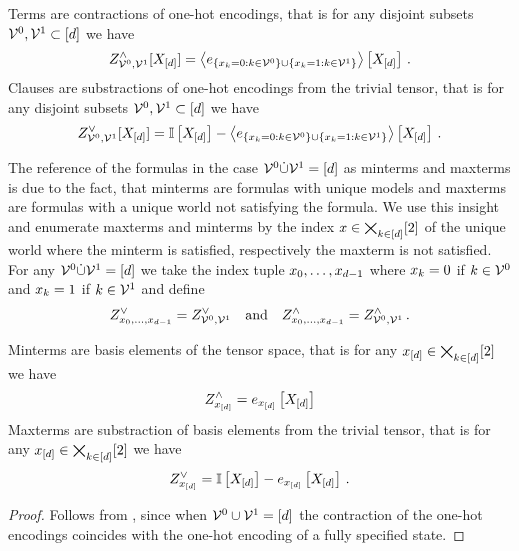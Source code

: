 \begin{lemma}\label{lem:termClauseOneHot}
	Terms are contractions of one-hot encodings, that is for any disjoint subsets $\mathcal{V}^{0},\mathcal{V}^{1}\subset[d]$ we have
		\[ Z^{\land}_{\mathcal{V}^{0},\mathcal{V}^{1}}[X_{[d]}] = \left\langle e_{\{x_{k}=0 : k\in\mathcal{V}^{0} \} \cup \{x_{k}=1 : k\in\mathcal{V}^{1}\}}\right\rangle \left[ X_{[d]} \right] \, . \]
	Clauses are substractions of one-hot encodings from the trivial tensor, that is for any disjoint subsets $\mathcal{V}^{0},\mathcal{V}^{1}\subset[d]$ we have
		\[ Z^{\lor}_{\mathcal{V}^{0},\mathcal{V}^{1}}[X_{[d]}] = 
		\mathbb{I}\left[X_{[d]}\right] -
		\left\langle e_{\{x_{k}=0 : k\in\mathcal{V}^{0} \} \cup \{x_{k}=1 : k\in\mathcal{V}^{1}\}}\right\rangle \left[ X_{[d]} \right] \, . \]
\end{lemma}


	
%
The reference of the formulas in the case $\mathcal{V}^{0}\dot{\cup}\mathcal{V}^{1} = [d]$ as minterms and maxterms is due to the fact, that minterms are formulas with unique models and maxterms are formulas with a unique world not satisfying the formula.
We use this insight and enumerate maxterms and minterms by the index $x\in\bigtimes_{k\in[d]}[2]$ of the unique world where the minterm is satisfied, respectively the maxterm is not satisfied.
For any $\mathcal{V}^{0}\dot{\cup}\mathcal{V}^{1} = [d]$ we take the index tuple $x_{0},\ldots,x_{d-1}$ where $x_{k}=0$ if $k\in\mathcal{V}^{0}$ and $x_{k}=1$ if $k\in\mathcal{V}^{1}$ and define
\begin{align*}
	Z^{\lor}_{x_{0},\ldots,x_{d-1}} = Z^{\lor}_{\mathcal{V}^{0},\mathcal{V}^{1}} \quad \text{and} \quad Z^{\land}_{x_{0},\ldots,x_{d-1}} = Z^{\land}_{\mathcal{V}^{0},\mathcal{V}^{1}} \, .
\end{align*}


\begin{corollary}
	Minterms are basis elements of the tensor space, that is for any $x_{[d]}\in\bigtimes_{k\in[d]}[2]$ we have
	\begin{align*}
		Z^{\land}_{x_{[d]}} = e_{x_{[d]}}\left[X_{[d]}\right]
	\end{align*}
	Maxterms are substraction of basis elements from the trivial tensor, that is for any $x_{[d]}\in\bigtimes_{k\in[d]}[2]$ we have
	\begin{align*}
		Z^{\lor}_{x_{[d]}} = \mathbb{I}\left[X_{[d]}\right] - e_{x_{[d]}}\left[X_{[d]}\right]  \, .
	\end{align*}
\end{corollary}
\begin{proof}
	Follows from , since when $\mathcal{V}^{0}\cup\mathcal{V}^{1} = [d]$ the contraction of the one-hot encodings coincides with the one-hot encoding of a fully specified state.
\end{proof}


